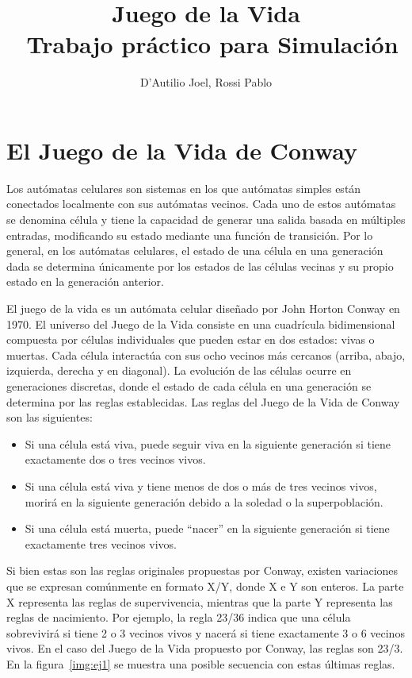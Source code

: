 \documentclass[12pt]{article}
\title{Juego de la Vida\\
\large~Trabajo práctico para Simulación}
\author{D'Autilio Joel, Rossi Pablo}
\date{}
\begin{document}
\maketitle


\section{El Juego de la Vida de Conway}


Los autómatas celulares son sistemas en los que autómatas simples están conectados localmente con sus autómatas vecinos. Cada uno de estos autómatas se denomina célula y tiene la capacidad de generar una salida basada en múltiples entradas, modificando su estado mediante una función de transición. Por lo general, en los autómatas celulares, el estado de una célula en una generación dada se determina únicamente por los estados de las células vecinas y su propio estado en la generación anterior.

El juego de la vida es un autómata celular diseñado por John Horton Conway en 1970. El universo del Juego de la Vida consiste en una cuadrícula bidimensional compuesta por células individuales que pueden estar en dos estados: vivas o muertas. Cada célula interactúa con sus ocho vecinos más cercanos (arriba, abajo, izquierda, derecha y en diagonal). La evolución de las células ocurre en generaciones discretas, donde el estado de cada célula en una generación se determina por las reglas establecidas. Las reglas del Juego de la Vida de Conway son las siguientes: 

\begin{itemize}
  \item Si una célula está viva, puede seguir viva en la siguiente generación si tiene exactamente dos o tres vecinos vivos. 
  \item Si una célula está viva y tiene menos de dos o más de tres vecinos vivos, morirá en la siguiente generación debido a la soledad o la superpoblación.
  \item Si una célula está muerta, puede ``nacer'' en la siguiente generación si tiene exactamente tres vecinos vivos.
\end{itemize}

Si bien estas son las reglas originales propuestas por Conway, existen variaciones que se expresan comúnmente en formato X/Y, donde X e Y son enteros. La parte X representa las reglas de supervivencia, mientras que la parte Y representa las reglas de nacimiento. Por ejemplo, la regla 23/36 indica que una célula sobrevivirá si tiene 2 o 3 vecinos vivos y nacerá si tiene exactamente 3 o 6 vecinos vivos. En el caso del Juego de la Vida propuesto por Conway, las reglas son 23/3. En la figura~\ref{img:ej1} se muestra una posible secuencia con estas últimas reglas.
\end{document}
